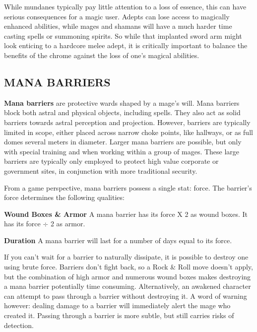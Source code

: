 \documentclass[oneside,10pt]{article}
\begin{document}
\begin{multicols}{2}
While mundanes typically pay little attention to a loss of essence, this can have serious consequences for a magic user. Adepts can lose access to magically enhanced abilities, while mages and shamans will have a much harder time casting spells or summoning spirits. So while that implanted sword arm might look enticing to a hardcore melee adept, it is critically important to balance the benefits of the chrome against the loss of one's magical abilities.

\subsection{MANA BARRIERS}

\textbf{Mana barriers} are protective wards shaped by a mage's will. Mana barriers block both astral and physical objects, including spells. They also act as solid barriers towards astral  perception and projection. However, barriers are typically limited in scope, either placed across narrow choke points, like hallways, or as full domes several meters in diameter. Larger mana barriers are possible, but only with special training and when working within a group of mages. These large barriers are typically only employed to protect high value corporate or government sites, in conjunction with more traditional security.

From a game perspective, mana barriers possess a single stat: force. The barrier's force determines the following qualities:

\begin{adjustwidth*}{.5cm}{.5cm}

\textbf{Wound Boxes \& Armor} A mana barrier has its force X 2 as wound boxes. It has its force $\div$ 2 as armor.

\textbf{Duration} A mana barrier will last for a number of days equal to its force.

\end{adjustwidth*}

If you can't wait for a barrier to naturally dissipate, it is possible to destroy one using brute force. Barriers don't fight back, so a Rock \& Roll move doesn't apply, but the combination of high armor and numerous wound boxes makes destroying a mana barrier potentially time consuming. Alternatively, an awakened character can attempt to pass through a barrier without destroying it. A word of warning however: dealing damage to a barrier will immediately alert the mage who created it. Passing through a barrier is more subtle, but still carries risks of detection.


\end{multicols}
\end{document}
